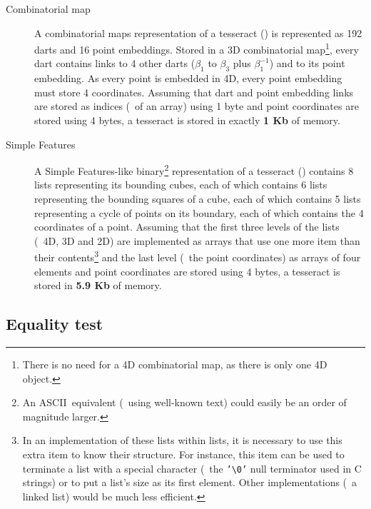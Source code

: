 \begin{description}
\item[Combinatorial map] A combinatorial maps representation of a tesseract () is represented as 192 darts and 16 point embeddings.
Stored in a 3D combinatorial map\footnote{There is no need for a 4D combinatorial map, as there is only one 4D object.}, every dart contains links to 4 other darts ($\beta_1$ to $\beta_3$ plus $\beta_1^{-1}$) and to its point embedding.
As every point is embedded in 4D, every point embedding must store 4 coordinates.
Assuming that dart and point embedding links are stored as indices (\eg\ of an array) using 1 byte and point coordinates are stored using 4 bytes, a tesseract is stored in exactly \textbf{1 Kb} of memory.

\item[Simple Features] A Simple Features-like binary\footnote{An ASCII\ equivalent (\eg\ using well-known text) could easily be an order of magnitude larger.} representation of a tesseract () contains 8 lists representing its bounding cubes, each of which contains 6 lists representing the bounding squares of a cube, each of which contains 5 lists representing a cycle of points on its boundary, each of which contains the 4 coordinates of a point.
Assuming that the first three levels of the lists (\ie\ 4D, 3D and 2D) are implemented as arrays that use one more item than their contents\footnote{In an implementation of these lists within lists, it is necessary to use this extra item to know their structure.
For instance, this item can be used to terminate a list with a special character (\eg\ the \texttt{'\textbackslash0'} null terminator used in C strings) or to put a list's size as its first element.
Other implementations (\eg\ a linked list) would be much less efficient.} and the last level (\ie\ the point coordinates) as arrays of four elements and point coordinates are stored using 4 bytes, a tesseract is stored in \textbf{5.9 Kb} of memory.
\end{description}

\subsection*{Equality test}

